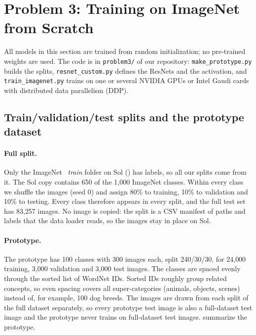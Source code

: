 \section{Problem 3: Training on ImageNet from Scratch}
\label{sec:p3}

All models in this section are trained from random initialization; no pre-trained weights are used.
The code is in \texttt{problem3/} of our repository: \texttt{make\_prototype.py} builds the splits, \texttt{resnet\_custom.py} defines the ResNets and the activation, and \texttt{train\_imagenet.py} trains on one or several NVIDIA GPUs or Intel Gaudi cards with distributed data parallelism (DDP).

\subsection{Train/validation/test splits and the prototype dataset}
\label{sec:p3-proto}

\paragraph{Full split.}
Only the ImageNet~\cite{deng2009imagenet} \emph{train} folder on Sol () has labels, so all our splits come from it.
The Sol copy contains 650 of the 1{,}000 ImageNet classes.
Within every class we shuffle the images (seed 0) and assign 80\% to training, 10\% to validation and 10\% to testing.
Every class therefore appears in every split, and the full test set has 83{,}257 images.
No image is copied: the split is a CSV manifest of paths and labels that the data loader reads, so the images stay in place on Sol.

\paragraph{Prototype.}
The prototype has 100 classes with 300 images each, split 240/30/30, for 24{,}000 training, 3{,}000 validation and 3{,}000 test images.
The classes are spaced evenly through the sorted list of WordNet IDs.
Sorted IDs roughly group related concepts, so even spacing covers all super-categories (animals, objects, scenes) instead of, for example, 100 dog breeds.
The images are drawn from each split of the full dataset separately, so every prototype test image is also a full-dataset test image and the prototype never trains on full-dataset test images.
 summarize the prototype.


